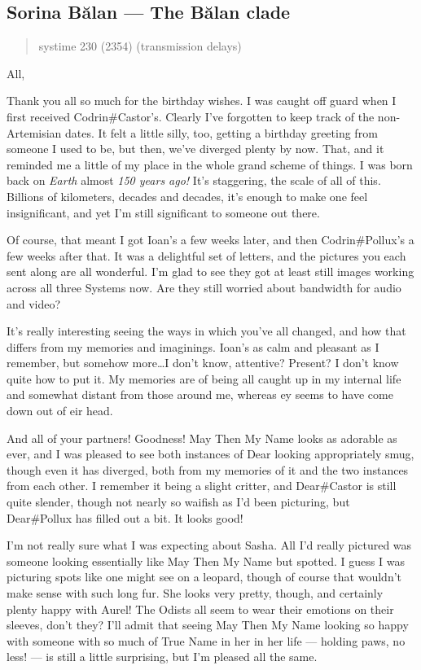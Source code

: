 \hypertarget{sorina-bux103lan-the-bux103lan-clade}{%
\subsection{Sorina Bălan — The Bălan clade}\label{sorina-bux103lan-the-bux103lan-clade}}

\begin{quote}
systime 230 (2354) (transmission delays)
\end{quote}

All,

Thank you all so much for the birthday wishes. I was caught off guard when I first received Codrin\#Castor's. Clearly I've forgotten to keep track of the non-Artemisian dates. It felt a little silly, too, getting a birthday greeting from someone I used to be, but then, we've diverged plenty by now. That, and it reminded me a little of my place in the whole grand scheme of things. I was born back on \emph{Earth} almost \emph{150 years ago!} It's staggering, the scale of all of this. Billions of kilometers, decades and decades, it's enough to make one feel insignificant, and yet I'm still significant to someone out there.

Of course, that meant I got Ioan's a few weeks later, and then Codrin\#Pollux's a few weeks after that. It was a delightful set of letters, and the pictures you each sent along are all wonderful. I'm glad to see they got at least still images working across all three Systems now. Are they still worried about bandwidth for audio and video?

It's really interesting seeing the ways in which you've all changed, and how that differs from my memories and imaginings. Ioan's as calm and pleasant as I remember, but somehow more\ldots I don't know, attentive? Present? I don't know quite how to put it. My memories are of being all caught up in my internal life and somewhat distant from those around me, whereas ey seems to have come down out of eir head.

And all of your partners! Goodness! May Then My Name looks as adorable as ever, and I was pleased to see both instances of Dear looking appropriately smug, though even it has diverged, both from my memories of it and the two instances from each other. I remember it being a slight critter, and Dear\#Castor is still quite slender, though not nearly so waifish as I'd been picturing, but Dear\#Pollux has filled out a bit. It looks good!

I'm not really sure what I was expecting about Sasha. All I'd really pictured was someone looking essentially like May Then My Name but spotted. I guess I was picturing spots like one might see on a leopard, though of course that wouldn't make sense with such long fur. She looks very pretty, though, and certainly plenty happy with Aurel! The Odists all seem to wear their emotions on their sleeves, don't they? I'll admit that seeing May Then My Name looking so happy with someone with so much of True Name in her in her life — holding paws, no less! — is still a little surprising, but I'm pleased all the same.


